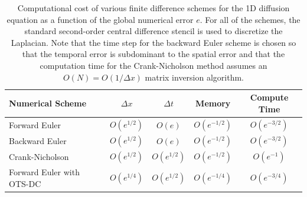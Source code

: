 \documentclass[fleqn,12pt,twoside]{article}
\def\dt{\Delta t}
\def\dx{\Delta x}
\begin{document}
\begin{table}[tb]
\caption{
Computational cost of various finite difference schemes for the 1D 
diffusion equation as a function of the global numerical error $e$.
For all of the schemes, the standard second-order central difference 
stencil is used to discretize the Laplacian.  
Note that the time step for the backward Euler scheme is chosen so that the
temporal error is subdominant to the spatial error and that the computation 
time for the Crank-Nicholson method assumes an $O(N) = O \left( 1/\dx\right)$ 
matrix inversion algorithm. 
}
\label{tab:comp_perf_vs_err} 
\renewcommand{\arraystretch}{1.5}
\centering
\begin{tabular}{lcccc}
  \hline
  {\bf Numerical Scheme} & $\dx$ 
  & $\dt$
  & {\bf Memory}
  & {\bf Compute Time}
  \\
  \hline 
  Forward Euler    & $O\left( e^{1/2} \right)$ 
                   & $O\left( e \right)$ 
                   & $O\left( e^{-1/2} \right)$ 
                   & $O\left( e^{-3/2} \right)$ \\
  Backward Euler   & $O\left( e^{1/2} \right)$ 
                   & $O\left( e \right)$ 
                   & $O\left( e^{-1/2} \right)$ 
                   & $O\left( e^{-3/2} \right)$ \\
  Crank-Nicholson  & $O\left( e^{1/2} \right)$ 
                   & $O\left( e^{1/2} \right)$ 
                   & $O\left( e^{-1/2} \right)$ 
                   & $O\left( e^{-1} \right)$ \\
  Forward Euler with OTS-DC & $O\left( e^{1/4} \right)$ 
                   & $O\left( e^{1/2} \right)$ 
                   & $O\left( e^{-1/4} \right)$ 
                   & $O\left( e^{-3/4} \right)$ \\ 
  \hline
\end{tabular}
\end{table}
\end{document}
